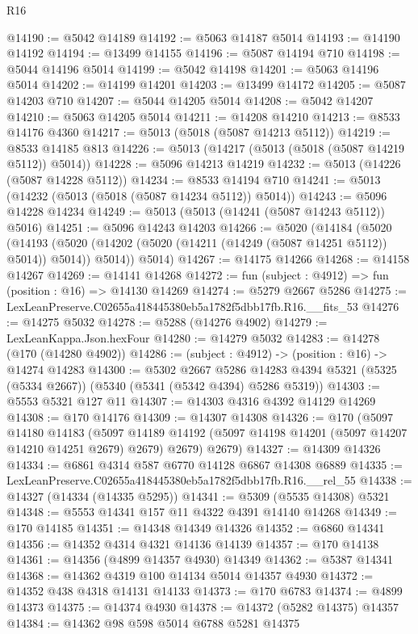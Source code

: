\begin{lexlean}{R16}
\begin{coremodule}
@14190 := @5042 @14189
@14192 := @5063 @14187 @5014
@14193 := @14190 @14192
@14194 := @13499 @14155
@14196 := @5087 @14194 @710
@14198 := @5044 @14196 @5014
@14199 := @5042 @14198
@14201 := @5063 @14196 @5014
@14202 := @14199 @14201
@14203 := @13499 @14172
@14205 := @5087 @14203 @710
@14207 := @5044 @14205 @5014
@14208 := @5042 @14207
@14210 := @5063 @14205 @5014
@14211 := @14208 @14210
@14213 := @8533 @14176 @4360
@14217 := @5013 (@5018 (@5087 @14213 @5112))
@14219 := @8533 @14185 @813
@14226 := @5013 (@14217 (@5013 (@5018 (@5087 @14219 @5112)) @5014))
@14228 := @5096 @14213 @14219
@14232 := @5013 (@14226 (@5087 @14228 @5112))
@14234 := @8533 @14194 @710
@14241 := @5013 (@14232 (@5013 (@5018 (@5087 @14234 @5112)) @5014))
@14243 := @5096 @14228 @14234
@14249 := @5013 (@5013 (@14241 (@5087 @14243 @5112)) @5016)
@14251 := @5096 @14243 @14203
@14266 := @5020
    (@14184
      (@5020
        (@14193 (@5020 (@14202 (@5020 (@14211 (@14249 (@5087 @14251 @5112)) @5014)) @5014)) @5014))
      @5014)
@14267 := @14175 @14266
@14268 := @14158 @14267
@14269 := @14141 @14268
@14272 := fun (subject : @4912) => fun (position : @16) => @14130 @14269
@14274 := @5279 @2667 @5286
@14275 := LexLeanPreserve.C02655a418445380eb5a1782f5dbb17fb.R16.__fits_53
@14276 := @14275 @5032
@14278 := @5288 (@14276 @4902)
@14279 := LexLeanKappa.Json.hexFour
@14280 := @14279 @5032
@14283 := @14278 (@170 (@14280 @4902))
@14286 := (subject : @4912) -> (position : @16) -> @14274 @14283
@14300 := @5302
    @2667
    @5286
    @14283
    @4394
    @5321
    (@5325 (@5334 @2667))
    (@5340 (@5341 (@5342 @4394) @5286 @5319))
@14303 := @5553 @5321 @127 @11
@14307 := @14303 @4316 @4392 @14129 @14269
@14308 := @170 @14176
@14309 := @14307 @14308
@14326 := @170
    (@5097
      @14180
      @14183
      (@5097 @14189 @14192 (@5097 @14198 @14201 (@5097 @14207 @14210 @14251 @2679) @2679) @2679)
      @2679)
@14327 := @14309 @14326
@14334 := @6861 @4314 @587 @6770 @14128 @6867 @14308 @6889
@14335 := LexLeanPreserve.C02655a418445380eb5a1782f5dbb17fb.R16.__rel_55
@14338 := @14327 (@14334 (@14335 @5295))
@14341 := @5309 (@5535 @14308) @5321
@14348 := @5553 @14341 @157 @11 @4322 @4391 @14140 @14268
@14349 := @170 @14185
@14351 := @14348 @14349 @14326
@14352 := @6860 @14341
@14356 := @14352 @4314 @4321 @14136 @14139
@14357 := @170 @14138
@14361 := @14356 (@4899 @14357 @4930) @14349
@14362 := @5387 @14341
@14368 := @14362 @4319 @100 @14134 @5014 @14357 @4930
@14372 := @14352 @438 @4318 @14131 @14133
@14373 := @170 @6783
@14374 := @4899 @14373
@14375 := @14374 @4930
@14378 := @14372 (@5282 @14375) @14357
@14384 := @14362 @98 @598 @5014 @6788 @5281 @14375

\end{coremodule}
\end{lexlean}

